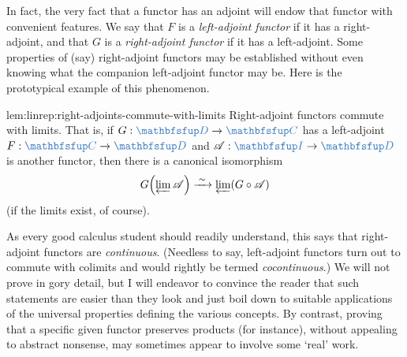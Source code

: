 In fact, the very fact that a functor has an adjoint will endow that
functor with convenient features. We say that $F$ is a
\emph{left-adjoint functor} if it has a right-adjoint, and that $G$ is
a \emph{right-adjoint functor} if it has a left-adjoint. Some
properties of (say) right-adjoint functors may be established without
even knowing what the companion left-adjoint functor may be. Here is
the prototypical example of this phenomenon.
\begin{lem}{}{lem:linrep:right-adjoints-commute-with-limits}
  Right-adjoint functors commute with limits. That is, if
  $G : \categ{D} \to \categ{C}$ has a left-adjoint
  $F : \categ{C} \to \categ{D}$ and
  $\mathscr{A} : \categ{I} \to \categ{D}$ is another functor, then
  there is a canonical isomorphism
  \[
    G\!\left(\varprojlim \mathscr{A}\right) \xrightarrow{\;\sim\;}
    \varprojlim(G \circ \mathscr{A})
  \]
  (if the limits exist, of course).
\end{lem}
As every good calculus student should readily understand, this says
that right-adjoint functors are \emph{continuous}. (Needless to say,
left-adjoint functors turn out to commute with colimits and would
rightly be termed \emph{cocontinuous}.)  We will not prove
 in gory detail,
but I will endeavor to convince the reader that such statements are
easier than they look and just boil down to suitable applications of
the universal properties defining the various concepts. By contrast,
proving that a specific given functor preserves products (for
instance), without appealing to abstract nonsense, may sometimes
appear to involve some `real' work.

